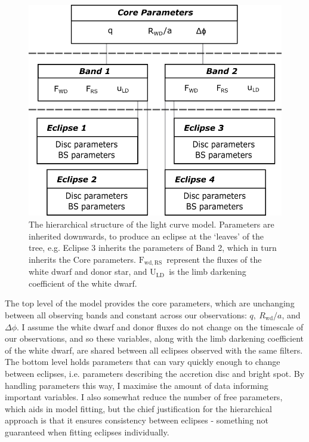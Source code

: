 \begin{figure}
    \centering
    \includegraphics[width=.85\columnwidth ]{figures/results/three_cvs_with_weird_colours/GeneralFigs/hierarchical_model_structure.png}
    \caption{The hierarchical structure of the light curve model. Parameters are inherited downwards, to produce an eclipse at the `leaves' of the tree, e.g. Eclipse 3 inherits the parameters of Band 2, which in turn inherits the Core parameters. $\mathrm{F_{wd, RS}}$\ represent the fluxes of the white dwarf and donor star, and $\mathrm{U_{LD}}$\ is the limb darkening coefficient of the white dwarf.}
    \label{fig:modelling:hierarchical_model}
\end{figure}

The top level of the model provides the core parameters, which are unchanging between all observing bands and constant across our observations: $q,\ R_\mathrm{wd}/a$, and $\Delta\phi$. I assume the white dwarf and donor fluxes do not change on the timescale of our observations, and so these variables, along with the limb darkening coefficient of the white dwarf, are shared between all eclipses observed with the same filters. The bottom level holds parameters that can vary quickly enough to change between eclipses, i.e. parameters describing the accretion disc and bright spot. By handling parameters this way, I maximise the amount of data informing important variables. I also somewhat reduce the number of free parameters, which aids in model fitting, but the chief justification for the hierarchical approach is that it ensures consistency between eclipses - something not guaranteed when fitting eclipses individually.

